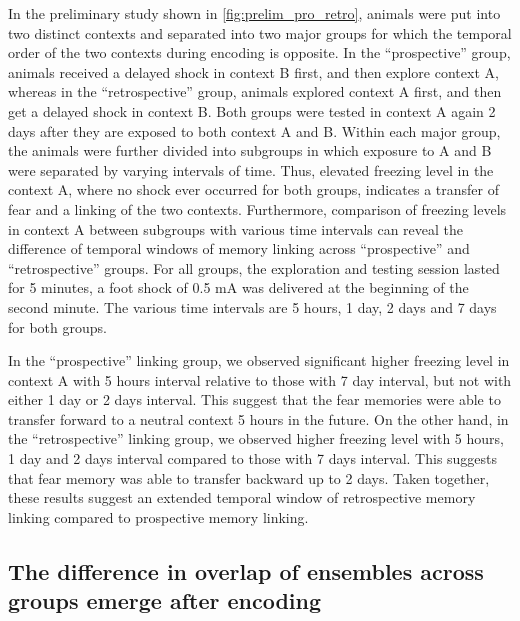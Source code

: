 \documentclass[master.tex]{subfiles}
\begin{document}
In the preliminary study shown in \autoref{fig:prelim_pro_retro}, animals were
put into two distinct contexts and separated into two major groups for which the
temporal order of the two contexts during encoding is opposite. In the
``prospective'' group, animals received a delayed shock in context B first, and
then explore context A, whereas in the ``retrospective'' group, animals explored
context A first, and then get a delayed shock in context B. Both groups were
tested in context A again 2 days after they are exposed to both context A and B.
Within each major group, the animals were further divided into subgroups in
which exposure to A and B were separated by varying intervals of time. Thus,
elevated freezing level in the context A, where no shock ever occurred for both
groups, indicates a transfer of fear and a linking of the two contexts.
Furthermore, comparison of freezing levels in context A between subgroups with
various time intervals can reveal the difference of temporal windows of memory
linking across ``prospective'' and ``retrospective'' groups. For all groups, the
exploration and testing session lasted for 5 minutes, a foot shock of 0.5 mA was
delivered at the beginning of the second minute. The various time intervals are
5 hours, 1 day, 2 days and 7 days for both groups.

In the ``prospective'' linking group, we observed significant higher freezing level
in context A with 5 hours interval relative to those with 7 day interval, but
not with either 1 day or 2 days interval. This suggest that the fear memories
were able to transfer forward to a neutral context 5 hours in the future. On the
other hand, in the ``retrospective'' linking group, we observed higher freezing
level with 5 hours, 1 day and 2 days interval compared to those with 7 days
interval. This suggests that fear memory was able to transfer backward up to 2
days. Taken together, these results suggest an extended temporal window of
retrospective memory linking compared to prospective memory linking.

\subsection*{The difference in overlap of ensembles across groups emerge after
  encoding}
\end{document}
